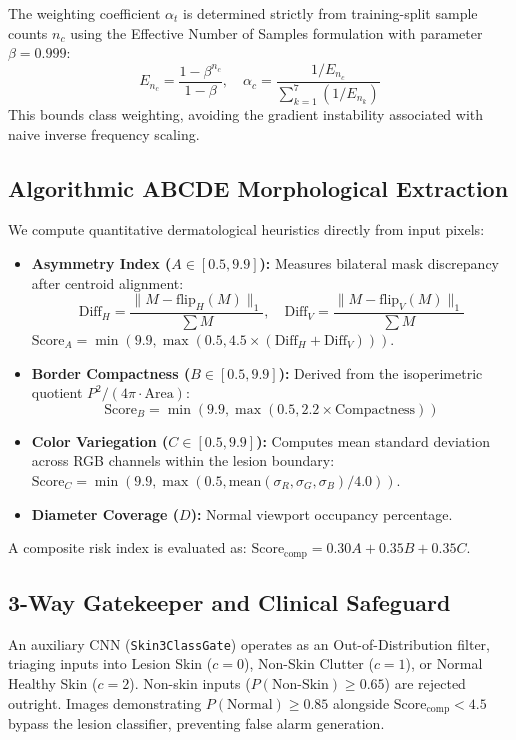 \documentclass[conference]{IEEEtran}
\begin{document}
The weighting coefficient $\alpha_t$ is determined strictly from training-split sample counts $n_c$ using the Effective Number of Samples formulation with parameter $\beta = 0.999$:
\begin{equation}
    E_{n_c} = \frac{1 - \beta^{n_c}}{1 - \beta}, \quad \alpha_c = \frac{1 / E_{n_c}}{\sum_{k=1}^7 (1 / E_{n_k})}
\end{equation}
This bounds class weighting, avoiding the gradient instability associated with naive inverse frequency scaling.

\subsection{Algorithmic ABCDE Morphological Extraction}
We compute quantitative dermatological heuristics directly from input pixels:
\begin{itemize}
    \item \textbf{Asymmetry Index ($A \in [0.5, 9.9]$):} Measures bilateral mask discrepancy after centroid alignment:
    \begin{equation}
        \text{Diff}_H = \frac{\|M - \text{flip}_H(M)\|_1}{\sum M}, \quad \text{Diff}_V = \frac{\|M - \text{flip}_V(M)\|_1}{\sum M}
    \end{equation}
    $\text{Score}_A = \min(9.9, \max(0.5, 4.5 \times (\text{Diff}_H + \text{Diff}_V)))$.
    \item \textbf{Border Compactness ($B \in [0.5, 9.9]$):} Derived from the isoperimetric quotient $P^2 / (4\pi \cdot \text{Area})$:
    \begin{equation}
        \text{Score}_B = \min(9.9, \max(0.5, 2.2 \times \text{Compactness}))
    \end{equation}
    \item \textbf{Color Variegation ($C \in [0.5, 9.9]$):} Computes mean standard deviation across RGB channels within the lesion boundary: $\text{Score}_C = \min(9.9, \max(0.5, \text{mean}(\sigma_R, \sigma_G, \sigma_B)/4.0))$.
    \item \textbf{Diameter Coverage ($D$):} Normal viewport occupancy percentage.
\end{itemize}
A composite risk index is evaluated as: $\text{Score}_{\text{comp}} = 0.30 A + 0.35 B + 0.35 C$.

\subsection{3-Way Gatekeeper and Clinical Safeguard}
An auxiliary CNN (\texttt{Skin3ClassGate}) operates as an Out-of-Distribution filter, triaging inputs into Lesion Skin ($c=0$), Non-Skin Clutter ($c=1$), or Normal Healthy Skin ($c=2$). Non-skin inputs ($P(\text{Non-Skin}) \ge 0.65$) are rejected outright. Images demonstrating $P(\text{Normal}) \ge 0.85$ alongside $\text{Score}_{\text{comp}} < 4.5$ bypass the lesion classifier, preventing false alarm generation.
\end{document}
